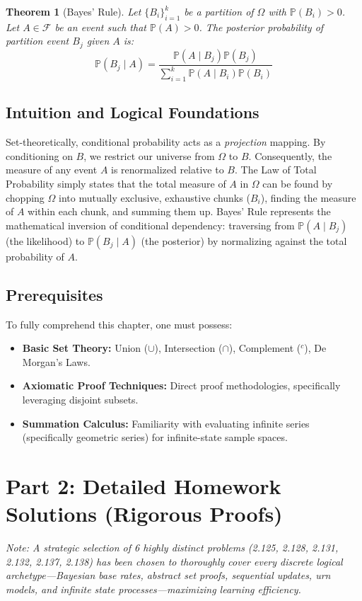 \documentclass[12pt]{article}
\newtheorem{theorem}{Theorem}[section]
\begin{document}
\begin{theorem}[Bayes' Rule]
Let $\{B_i\}_{i=1}^k$ be a partition of $\Omega$ with $\mathbb{P}(B_i) > 0$. Let $A \in \mathcal{F}$ be an event such that $\mathbb{P}(A) > 0$. The posterior probability of partition event $B_j$ given $A$ is:
\[ \mathbb{P}(B_j \mid A) = \frac{\mathbb{P}(A \mid B_j) \mathbb{P}(B_j)}{\sum_{i=1}^k \mathbb{P}(A \mid B_i) \mathbb{P}(B_i)} \]
\end{theorem}

\subsection{Intuition and Logical Foundations}
Set-theoretically, conditional probability acts as a \textit{projection} mapping. By conditioning on $B$, we restrict our universe from $\Omega$ to $B$. Consequently, the measure of any event $A$ is renormalized relative to $B$. The Law of Total Probability simply states that the total measure of $A$ in $\Omega$ can be found by chopping $\Omega$ into mutually exclusive, exhaustive chunks ($B_i$), finding the measure of $A$ within each chunk, and summing them up. Bayes' Rule represents the mathematical inversion of conditional dependency: traversing from $\mathbb{P}(A \mid B_j)$ (the likelihood) to $\mathbb{P}(B_j \mid A)$ (the posterior) by normalizing against the total probability of $A$.

\subsection{Prerequisites}
To fully comprehend this chapter, one must possess:
\begin{itemize}
    \item \textbf{Basic Set Theory:} Union ($\cup$), Intersection ($\cap$), Complement ($^c$), De Morgan's Laws.
    \item \textbf{Axiomatic Proof Techniques:} Direct proof methodologies, specifically leveraging disjoint subsets.
    \item \textbf{Summation Calculus:} Familiarity with evaluating infinite series (specifically geometric series) for infinite-state sample spaces.
\end{itemize}

\newpage
\section{Part 2: Detailed Homework Solutions (Rigorous Proofs)}
\textit{Note: A strategic selection of 6 highly distinct problems (2.125, 2.128, 2.131, 2.132, 2.137, 2.138) has been chosen to thoroughly cover every discrete logical archetype—Bayesian base rates, abstract set proofs, sequential updates, urn models, and infinite state processes—maximizing learning efficiency.}
\end{document}
